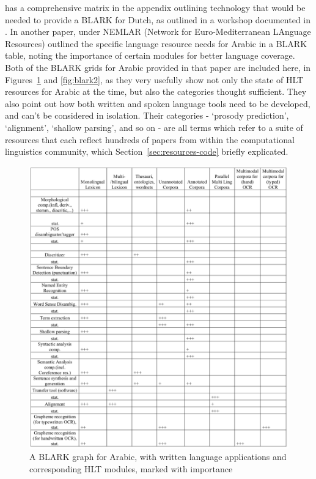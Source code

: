 \citet{krauwer2003basic} has a comprehensive matrix in the appendix outlining technology that would be needed to provide a BLARK for Dutch, as outlined in a workshop documented in \citet{binnenpoorte2002towards}. In another paper, \citet{maegaard2006blark} under NEMLAR (Network  for  Euro-Mediterranean  LAnguage  Resources) outlined the specific language resource needs for Arabic in a BLARK table, noting the importance of certain modules for better language coverage. Both of the BLARK grids for Arabic provided in that paper are included here, in Figures~\ref{fig:blark1} and \ref{fig:blark2}, as they very usefully show not only the state of HLT resources for Arabic at the time, but also the categories thought sufficient. They also point out how both written and spoken language tools need to be developed, and can't be considered in isolation. Their categories - `prosody prediction', `alignment', `shallow parsing', and so on - are all terms which refer to a suite of resources that each reflect hundreds of papers from within the computational linguistics community, which Section~\ref{sec:resources-code} briefly explicated.

\begin{figure}
 \centering
 \includegraphics[width=1\textwidth]{img/blark1.png}
 \caption{A BLARK graph for Arabic, with written language applications and corresponding HLT modules, marked with importance \citep[775]{maegaard2006blark}}
 \label{fig:blark1}
\end{figure}

